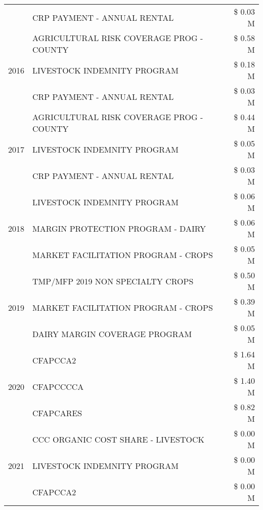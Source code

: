 \begin{tabular}{llr}
 & CRP PAYMENT - ANNUAL RENTAL & \$ 0.03 M \\
\cline{1-3}
\multirow[t]{3}{*}{2016} & AGRICULTURAL RISK COVERAGE PROG - COUNTY & \$ 0.58 M \\
 & LIVESTOCK INDEMNITY PROGRAM & \$ 0.18 M \\
 & CRP PAYMENT - ANNUAL RENTAL & \$ 0.03 M \\
\cline{1-3}
\multirow[t]{3}{*}{2017} & AGRICULTURAL RISK COVERAGE PROG - COUNTY & \$ 0.44 M \\
 & LIVESTOCK INDEMNITY PROGRAM & \$ 0.05 M \\
 & CRP PAYMENT - ANNUAL RENTAL & \$ 0.03 M \\
\cline{1-3}
\multirow[t]{3}{*}{2018} & LIVESTOCK INDEMNITY PROGRAM & \$ 0.06 M \\
 & MARGIN PROTECTION PROGRAM - DAIRY & \$ 0.06 M \\
 & MARKET FACILITATION PROGRAM - CROPS & \$ 0.05 M \\
\cline{1-3}
\multirow[t]{3}{*}{2019} & TMP/MFP 2019 NON SPECIALTY CROPS & \$ 0.50 M \\
 & MARKET FACILITATION PROGRAM - CROPS & \$ 0.39 M \\
 & DAIRY MARGIN COVERAGE PROGRAM & \$ 0.05 M \\
\cline{1-3}
\multirow[t]{3}{*}{2020} & CFAPCCA2 & \$ 1.64 M \\
 & CFAPCCCCA & \$ 1.40 M \\
 & CFAPCARES & \$ 0.82 M \\
\cline{1-3}
\multirow[t]{3}{*}{2021} & CCC ORGANIC COST SHARE - LIVESTOCK & \$ 0.00 M \\
 & LIVESTOCK INDEMNITY PROGRAM & \$ 0.00 M \\
 & CFAPCCA2 & \$ 0.00 M \\
\cline{1-3}
\bottomrule
\end{tabular}
